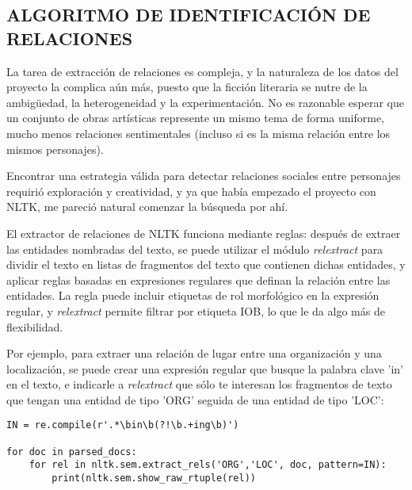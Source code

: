 \documentclass{pre-tfg}
\begin{document}


\subsection{ALGORITMO DE IDENTIFICACIÓN DE RELACIONES}

La tarea de extracción de relaciones es compleja, y la naturaleza de los datos del proyecto la complica aún más, puesto que la ficción literaria se nutre de la ambigüedad, la heterogeneidad y la experimentación. No es razonable esperar que un conjunto de obras artísticas represente un mismo tema de forma uniforme, mucho menos relaciones sentimentales (incluso si es la misma relación entre los mismos personajes).

Encontrar una estrategia válida para detectar relaciones sociales entre personajes requirió exploración y creatividad, y ya que había empezado el proyecto con NLTK, me pareció natural comenzar la búsqueda por ahí.

El extractor de relaciones de NLTK funciona mediante reglas: después de extraer las entidades nombradas del texto, se puede utilizar el módulo \textit{relextract} para dividir el texto en listas de fragmentos del texto que contienen dichas entidades, y aplicar reglas basadas en expresiones regulares que definan la relación entre las entidades. La regla puede incluir etiquetas de rol morfológico en la expresión regular, y \textit{relextract} permite filtrar por etiqueta IOB, lo que le da algo más de flexibilidad.

Por ejemplo, para extraer una relación de lugar entre una organización y una localización, se puede crear una expresión regular que busque la palabra clave 'in' en el texto, e indicarle a \textit{relextract} que sólo te interesan los fragmentos de texto que tengan una entidad de tipo 'ORG' seguida de una entidad de tipo 'LOC':
\begin{lstlisting}[style=consola, caption=Ejemplo de código que utiliza el módulo \textit{regexp} de NLTK para extraer relaciones de lugar y mostrarlas por pantalla. Adaptado del capítulo 7 de Natural Language Processing with Python\cite{bird_2012}]
IN = re.compile(r'.*\bin\b(?!\b.+ing\b)')

for doc in parsed_docs:
	for rel in nltk.sem.extract_rels('ORG','LOC', doc, pattern=IN):
		print(nltk.sem.show_raw_rtuple(rel))

\end{lstlisting}
\end{document}
